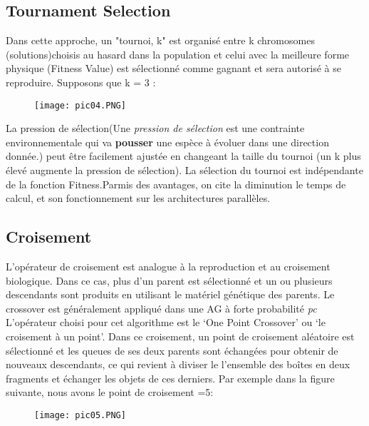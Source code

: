 \documentclass{report}
\begin{document}
\subsection{Tournament Selection}
Dans cette approche, un "tournoi, k" est organisé entre k chromosomes (solutions)choisis au hasard dans la population et celui avec la meilleure forme physique (Fitness Value) est sélectionné comme gagnant et sera autorisé à se reproduire.
\newline
Supposons que k = 3 :
\begin{figure}[H]
  \texttt{[image: pic04.PNG]}
\end{figure}
La pression de sélection(Une \textit{pression de sélection} est une contrainte environnementale qui va \textbf{pousser} une espèce à évoluer dans une direction donnée.) peut être facilement ajustée en changeant la taille du tournoi (un k plus élevé augmente la pression de sélection).
La sélection du tournoi est indépendante de la fonction Fitness.Parmis des avantages, on cite la diminution le temps de calcul, et son fonctionnement sur les architectures parallèles.
\subsection{Croisement}
L'opérateur de croisement est analogue à la reproduction et au croisement biologique. Dans ce cas, plus d'un parent est sélectionné et un ou plusieurs descendants sont produits en utilisant le matériel génétique des parents. Le crossover est généralement appliqué dans une AG à forte probabilité \textit{pc}
\newline
L’opérateur choisi pour cet algorithme est le ‘One Point Crossover’ ou ‘le croisement à un point’. Dans ce croisement, un point de croisement aléatoire est sélectionné et les queues de ses deux parents sont échangées pour obtenir de nouveaux descendants, ce qui revient à diviser le l’ensemble des boîtes en deux fragments et échanger les objets de ces derniers.
\newline
Par exemple dans la figure suivante, nous avons le point de croisement =5:
\begin{figure}[H]
  \texttt{[image: pic05.PNG]}
\end{figure}
\end{document}
